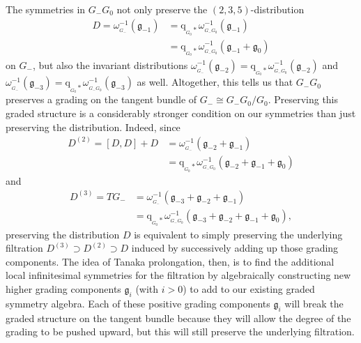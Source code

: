 \documentclass[12pt,a4paper]{amsart}
\theoremstyle{definition}
\newcommand{\MC}[1]{\omega_{{}_{#1}}}
\begin{document}
The symmetries in $G_-G_0$ not only preserve the $(2,3,5)$-distribution
\begin{align*}D=\MC{G_-}^{-1}(\mathfrak{g}_{-1}) & =\mathrm{q}_{{}_{G_0}*}\MC{G_-G_0}^{-1}(\mathfrak{g}_{-1}) \\ & =\mathrm{q}_{{}_{G_0}*}\MC{G_-G_0}^{-1}(\mathfrak{g}_{-1}+\mathfrak{g}_0)\end{align*}
on $G_-$, but also the invariant distributions $\MC{G_-}^{-1}(\mathfrak{g}_{-2})=\mathrm{q}_{{}_{G_0}*}\MC{G_-G_0}^{-1}(\mathfrak{g}_{-2})$ and $\MC{G_-}^{-1}(\mathfrak{g}_{-3})=\mathrm{q}_{{}_{G_0}*}\MC{G_-G_0}^{-1}(\mathfrak{g}_{-3})$ as well. Altogether, this tells us that $G_-G_0$ preserves a grading on the tangent bundle of $G_-\cong G_-G_0/G_0$. Preserving this graded structure is a considerably stronger condition on our symmetries than just preserving the distribution. Indeed, since
\begin{align*}D^{(2)}=[D,D]+D & =\MC{G_-}^{-1}(\mathfrak{g}_{-2}+\mathfrak{g}_{-1}) \\ & =\mathrm{q}_{{}_{G_0}*}\MC{G_-G_0}^{-1}(\mathfrak{g}_{-2}+\mathfrak{g}_{-1}+\mathfrak{g}_0)\end{align*}
and
\begin{align*}D^{(3)}=TG_- & =\MC{G_-}^{-1}(\mathfrak{g}_{-3}+\mathfrak{g}_{-2}+\mathfrak{g}_{-1}) \\ & =\mathrm{q}_{{}_{G_0}*}\MC{G_-G_0}^{-1}(\mathfrak{g}_{-3}+\mathfrak{g}_{-2}+\mathfrak{g}_{-1}+\mathfrak{g}_0),\end{align*}
preserving the distribution $D$ is equivalent to simply preserving the underlying filtration $D^{(3)}\supset D^{(2)}\supset D$ induced by successively adding up those grading components. The idea of Tanaka prolongation, then, is to find the additional local infinitesimal symmetries for the filtration by algebraically constructing new higher grading components $\mathfrak{g}_i$ (with $i>0$) to add to our existing graded symmetry algebra. Each of these positive grading components $\mathfrak{g}_i$ will break the graded structure on the tangent bundle because they will allow the degree of the grading to be pushed upward, but this will still preserve the underlying filtration.
\end{document}
